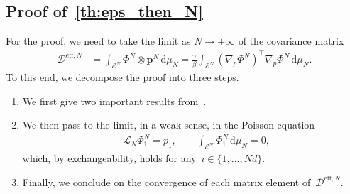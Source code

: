 \documentclass[onefignum,onetabnum]{siamart251216} %
\renewcommand{\d}{\mathrm{d}}
\newcommand{\mc}[1]{\mathcal{#1}}
\newcommand{\mescin}{\mu}
\newcommand{\DeffN}{\mc{D}^{\mathrm{eff},N}}
\newcommand{\vP}[1]{\mathbf{p}^{#1}}
\theoremstyle{plain}
\numberwithin{equation}{section}
\numberwithin{theorem}{section}
\begin{document}
\subsection{Proof of~\texorpdfstring{\cref{th:eps_then_N}}{Theorem~\ref{th:eps_then_N}}}
\label{sec:proof_lim_cov_particle_system}
For the proof, we need to take the limit as $N \rightarrow +\infty$ of the covariance matrix
\begin{align}
    \label{eq:D_N}
    \DeffN  &= \displaystyle\int_{\mc{E}^N}\Phi^N \otimes \vP{N} \, \d\mu_N = \frac{\gamma}{\beta}\int_{\mc{E}^N} (\nabla_p\Phi^N)^\top\nabla_p\Phi^N \, \d\mu_N.
\end{align}
To this end, we decompose the proof into three steps.
\begin{enumerate}
    \item We first give two important results from~\cite[Proof of Theorem 1.16]{delgadino2021diffusive}.
    \item We then pass to the limit, in a weak sense, in the Poisson equation
    \begin{align}
        \label{eq:poisson_eq_Nbis}
        -\mathcal{L}_N\Phi_1^N = p_1,\qquad  \int_{\mc{E}^N}\Phi_1^N \,\d \mescin_N =0,
    \end{align}
    which, by exchangeability, holds for any~$i \in \{1,\dots,Nd\}$.
    \item Finally, we conclude on the convergence of each matrix element of~$\DeffN$.
\end{enumerate}

\end{document}
